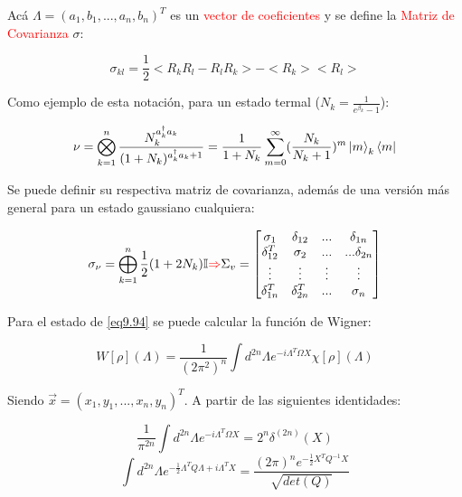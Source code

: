\documentclass{book}
\begin{document}
Acá $\Lambda=(a_1,b_1,...,a_n,b_n)^T$ es un \textcolor{red}{vector de coeficientes} y se define la \textcolor{red}{Matriz de Covarianza} $\sigma$:

\begin{equation}\label{eq9.95}\sigma_{kl}=\frac{1}{2}<R_kR_l-R_lR_k>-<R_k><R_l>\end{equation}

Como ejemplo de esta notación, para un estado termal ($N_k=\frac{1}{e^{\beta_k}-1}$):

\begin{equation}\label{eq9.96}\nu=\bigotimes_{k=1}^n \frac{N_k^{a_k^\dag a_k}}{(1+N_k)^{a_k^\dag a_k+1}}=\frac{1}{1+N_k}\sum_{m=0}^\infty(\frac{N_k}{N_k+1})^m \ket{m}_k\bra{m}\end{equation}

Se puede definir su respectiva matriz de covarianza, además de una versión más general para un estado gaussiano cualquiera:

\begin{equation}\label{eq9.97}\sigma_\nu=\bigoplus_{k=1}^n\frac{1}{2}(1+2N_k)\mathbb{I}\textcolor{red}{\Rightarrow}\Sigma_v=\begin{bmatrix}\sigma_1 & \delta_{12} & ... & \delta_{1n} \\ \delta^T_{12} & \sigma_2 & ... & ...\delta_{2n} \\ \vdots & \vdots & \vdots & \vdots\\ \delta_{1n}^T & \delta_{2n}^T& ... & \sigma_n\end{bmatrix}\end{equation}

Para el estado de \ref{eq9.94} se puede calcular la función de Wigner:

\begin{equation}\label{eq9.98
}W[\rho](\Lambda)=\frac{1}{(2\pi^2)^n}\int d^{2n}\Lambda e^{-i\Lambda^T\Omega X}\chi[\rho](\Lambda)\end{equation}

Siendo $\vec{x}=(x_1,y_1,...,x_n,y_n)^T$. A partir de las siguientes identidades:

\begin{equation}\label{eq9.99}\frac{1}{\pi^{2n}}\int d^{2n}\Lambda e^{-i\Lambda^T\Omega X}=2^n\delta^{(2n)}(X)\end{equation}
\begin{equation}\label{eq9.100}\int d^{2n}\Lambda e^{-\frac{1}{2}\Lambda^TQ\Lambda+i\Lambda^TX}=\frac{(2\pi)^ne^{-\frac{1}{2}X^TQ^{-1}X}}{\sqrt{det(Q)}}\end{equation}
\end{document}
